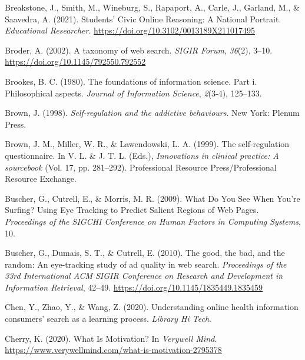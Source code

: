 \documentclass[letterpaper, nobind]{templates/ociamthesis}
\newlength{\cslhangindent}
\newenvironment{CSLReferences}[2] %
 {%
  \setlength{\parindent}{0pt}
  \ifodd #1
  \let\oldpar\par
  \def\par{\hangindent=\cslhangindent\oldpar}
  \fi
  \setlength{\parskip}{1mm}
  \setlength{\baselineskip}{6mm}
 }%
 {}
\begin{document}
\begin{CSLReferences}{1}{0}
\leavevmode{}%
Breakstone, J., Smith, M., Wineburg, S., Rapaport, A., Carle, J., Garland, M., \& Saavedra, A. (2021). Students' {Civic Online Reasoning}: A {National Portrait}. \emph{Educational Researcher}. \url{https://doi.org/10.3102/0013189X211017495}

\leavevmode{}%
Broder, A. (2002). A taxonomy of web search. \emph{SIGIR Forum}, \emph{36}(2), 3--10. \url{https://doi.org/10.1145/792550.792552}

\leavevmode{}%
Brookes, B. C. (1980). The foundations of information science. Part i. Philosophical aspects. \emph{Journal of Information Science}, \emph{2}(3-4), 125--133.

\leavevmode{}%
Brown, J. (1998). \emph{Self-regulation and the addictive behaviours}. New York: Plenum Press.

\leavevmode{}%
Brown, J. M., Miller, W. R., \& Lawendowski, L. A. (1999). The self-regulation questionnaire. In V. L. \& J. T. L. (Eds.), \emph{Innovations in clinical practice: A sourcebook} (Vol. 17, pp. 281--292). Professional Resource Press/Professional Resource Exchange.

\leavevmode{}%
Buscher, G., Cutrell, E., \& Morris, M. R. (2009). What {Do You See When You}'re {Surfing}? {Using Eye Tracking} to {Predict Salient Regions} of {Web Pages}. \emph{Proceedings of the SIGCHI Conference on Human Factors in Computing Systems}, 10.

\leavevmode{}%
Buscher, G., Dumais, S. T., \& Cutrell, E. (2010). The good, the bad, and the random: {An} eye-tracking study of ad quality in web search. \emph{Proceedings of the 33rd International {ACM SIGIR} Conference on Research and Development in Information Retrieval}, 42--49. \url{https://doi.org/10.1145/1835449.1835459}

\leavevmode{}%
Chen, Y., Zhao, Y., \& Wang, Z. (2020). Understanding online health information consumers' search as a learning process. \emph{Library Hi Tech}.

\leavevmode{}%
Cherry, K. (2020). What {Is Motivation}? In \emph{Verywell Mind}. \url{https://www.verywellmind.com/what-is-motivation-2795378}


\end{CSLReferences}
\end{document}
